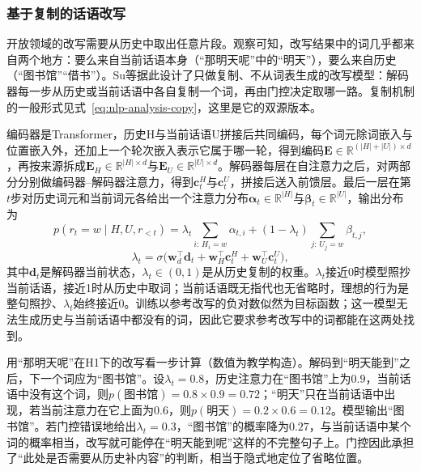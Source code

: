\subsubsection{基于复制的话语改写}
\label{sec:nlp-analysis-copy-rewriting}

开放领域的改写需要从历史中取出任意片段。观察可知，改写结果中的词几乎都来自两个地方：要么来自当前话语本身（“那明天呢”中的“明天”），要么来自历史（“图书馆”“借书”）。Su等据此设计了只做复制、不从词表生成的改写模型：解码器每一步从历史或当前话语中各自复制一个词，再由门控决定取哪一路。复制机制的一般形式见式~\eqref{eq:nlp-analysis-copy}，这里是它的双源版本。

编码器是Transformer，历史H与当前话语U拼接后共同编码，每个词元除词嵌入与位置嵌入外，还加上一个轮次嵌入表示它属于哪一轮，得到编码$\bm E\in\mathbb R^{(|H|+|U|)\times d}$，再按来源拆成$\bm E_H\in\mathbb R^{|H|\times d}$与$\bm E_U\in\mathbb R^{|U|\times d}$。解码器每层在自注意力之后，对两部分分别做编码器--解码器注意力，得到$\bm c^H_t$与$\bm c^U_t$，拼接后送入前馈层。最后一层在第$t$步对历史词元和当前词元各给出一个注意力分布$\bm\alpha_t\in\mathbb R^{|H|}$与$\bm\beta_t\in\mathbb R^{|U|}$，输出分布为
\begin{equation}
  p(r_t=w\mid H,U,r_{<t})=\lambda_t\sum_{i:\,H_i=w}\alpha_{t,i}+(1-\lambda_t)\sum_{j:\,U_j=w}\beta_{t,j},
  \label{eq:nlp-analysis-two-source-copy}
\end{equation}
\begin{equation}
  \lambda_t=\sigma\bigl(\bm w_d^{\top}\bm d_t+\bm w_H^{\top}\bm c^H_t+\bm w_U^{\top}\bm c^U_t\bigr),
  \label{eq:nlp-analysis-copy-gate}
\end{equation}
其中$\bm d_t$是解码器当前状态，$\lambda_t\in(0,1)$是从历史复制的权重。$\lambda_t$接近0时模型照抄当前话语，接近1时从历史中取词；当前话语既无指代也无省略时，理想的行为是整句照抄、$\lambda_t$始终接近0。训练以参考改写的负对数似然为目标函数；这一模型无法生成历史与当前话语中都没有的词，因此它要求参考改写中的词都能在这两处找到。

用“那明天呢”在H1下的改写看一步计算（数值为教学构造）。解码到“明天能到”之后，下一个词应为“图书馆”。设$\lambda_t=0.8$，历史注意力在“图书馆”上为$0.9$，当前话语中没有这个词，则$p(\text{图书馆})=0.8\times0.9=0.72$；“明天”只在当前话语中出现，若当前注意力在它上面为$0.6$，则$p(\text{明天})=0.2\times0.6=0.12$。模型输出“图书馆”。若门控错误地给出$\lambda_t=0.3$，“图书馆”的概率降为$0.27$，与当前话语中某个词的概率相当，改写就可能停在“明天能到呢”这样的不完整句子上。门控因此承担了“此处是否需要从历史补内容”的判断，相当于隐式地定位了省略位置。

